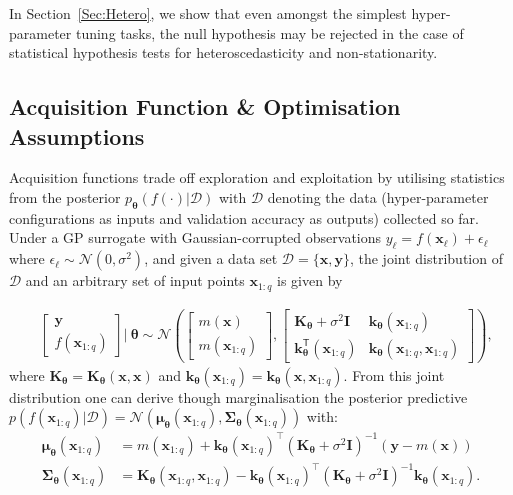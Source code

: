 \documentclass[jair,twoside,11pt,theapa]{article}
\let\cite\shortcite
\theoremstyle{definition}
\begin{document}
\noindent In Section~\ref{Sec:Hetero}, we show that even amongst the simplest hyper-parameter tuning tasks, the null hypothesis may be rejected in the case of statistical hypothesis tests for heteroscedasticity and non-stationarity. 

\subsection{Acquisition Function \& Optimisation Assumptions} \label{Sec:AcqAssumptions}
Acquisition functions trade off exploration and exploitation by utilising statistics from the posterior $p_{\bm{\theta}}(f(\cdot)|\mathcal{D})$ with $\mathcal{D}$ denoting the data (hyper-parameter configurations as inputs and validation accuracy as outputs) collected so far. Under a GP surrogate with Gaussian-corrupted observations $y_\ell = f(\boldsymbol{x}_\ell) + \epsilon_\ell$ where $\epsilon_\ell \sim \mathcal{N}(0, \sigma^2)$, and given a data set $\mathcal{D} = \{\boldsymbol{x}, \boldsymbol{y}\}$, the joint distribution of $\mathcal{D}$ and an arbitrary set of input points $\boldsymbol{x}_{1:q}$ is given by

\begin{align*}
&\left[\begin{array}{c}
      \bm{y}  \\
      f(\bm{x}_{1:q}) 
        \end{array}
        \right] \Bigg| \ \bm{\theta} \sim \nonumber  \mathcal{N}\left(\left[\begin{array}{cc}
        m(\bm{x}) \\
        m(\bm{x}_{1:q})
        \end{array}
        \right], \left[\begin{array}{cc}
      \bm{K}_{\bm{\theta}} + \sigma^{2} \bm{I} &  \bm{k}_{\bm{\theta}}(\bm{x}_{1:q})  \\
      \bm{k}^{\mathsf{T}}_{\bm{\theta}}(\bm{x}_{1:q}) & \bm{k}_{\bm{\theta}}(\bm{x}_{1:q}, \bm{x}_{1:q})  
        \end{array}
        \right]\right),
    \end{align*}
where $\bm{K}_{\bm{\theta}} = \bm{K}_{\bm{\theta}}(\bm{x}, \bm{x})$ and $\bm{k}_{\bm{\theta}}(\bm{x}_{1:q}) = \bm{k}_{\bm{\theta}}(\bm{x}, \bm{x}_{1:q})$. From this joint distribution one can derive though marginalisation \cite{2006_Williams} the posterior predictive $p(f(\bm{x}_{1:q})|\mathcal{D}) = \mathcal{N}(\bm{\mu}_{\bm{\theta}}(\bm{x}_{1:q}), \bm{\Sigma}_{\bm{\theta}}(\bm{x}_{1:q}))$ with:
\begin{align*}
    \bm{\mu}_{\bm{\theta}}(\bm{x}_{1:q}) &= m(\bm{x}_{1:q}) + \bm{k}_{\bm{\theta}}(\bm{x}_{1:q})^\top(\bm{K}_{\bm{\theta}} + \sigma^{2} \bm{I})^{-1}(\bm{y}-m(\bm{x})) \\
     \bm{\Sigma}_{\bm{\theta}}(\bm{x}_{1:q}) & = \bm{K}_{\bm{\theta}}(\bm{x}_{1:q}, \bm{x}_{1:q}) - \bm{k}_{\bm{\theta}}(\bm{x}_{1:q})^\top(\bm{K}_{\bm{\theta}} + \sigma^{2} \bm{I})^{-1}\bm{k}_{\bm{\theta}}(\bm{x}_{1:q}).
\end{align*} 
\end{document}
